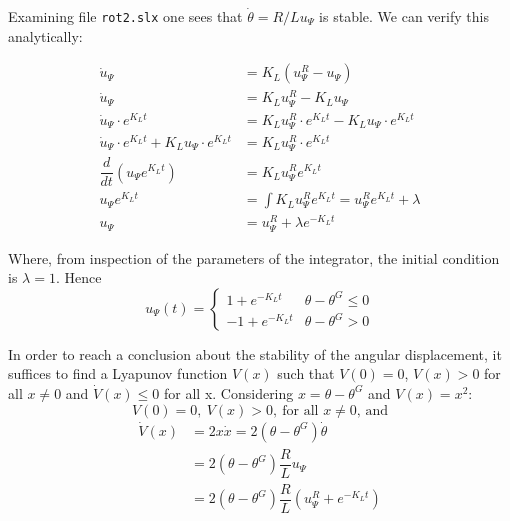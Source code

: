 Examining file \texttt{rot2.slx} one sees that $\dot{\theta} = R/L u_{\Psi}$ is
stable. We can verify this analytically:

\begin{align*}
  \dot{u}_{\Psi} &= K_L (u_{\Psi}^R - u_{\Psi})  \\
  \dot{u}_{\Psi} &= K_L u_{\Psi}^R - K_L u_{\Psi}  \\
  \dot{u}_{\Psi} \cdot e^{K_L t} &= K_L u_{\Psi}^R \cdot e^{K_L t} - K_L u_{\Psi} \cdot e^{K_L t}  \\
  \dot{u}_{\Psi} \cdot e^{K_L t} + K_L u_{\Psi} \cdot e^{K_L t} &= K_L u_{\Psi}^R \cdot e^{K_L t} \\
  \dfrac{d}{dt}(u_{\Psi} e^{K_L t}) &= K_L u_{\Psi}^R e^{K_L t} \\
  u_{\Psi} e^{K_L t} &= \int K_L u_{\Psi}^R e^{K_L t} = u_{\Psi}^R e^{K_L t} + \lambda \\
  u_{\Psi} &= u_{\Psi}^R + \lambda e^{-K_L t}
\end{align*}

Where, from inspection of the parameters of the integrator, the initial
condition is $\lambda = 1$. Hence
\begin{equation}
  u_{\Psi}(t) = \left\{
    \begin{matrix}
    1 + e^{-K_L t} & \theta - \theta^G \leq 0 \\
    -1 +e^{-K_L t} & \theta - \theta^G > 0
    \end{matrix}\right.
\end{equation}

In order to reach a conclusion about the stability of the angular displacement,
it suffices to find a Lyapunov function $V(x)$ such that $V(0) = 0$, $V(x) > 0$
for all $x \neq 0$ and $\dot{V}(x) \leq 0$ for all x. Considering
$x = \theta - \theta^G$ and $V(x) = x^2$:
$$V(0) = 0,\ V(x) > 0,\ \text{for all } x \neq 0\text{, and}$$
\begin{align*}
  \dot{V}(x) &= 2 x \dot{x} = 2 (\theta - \theta^G) \dot{\theta}  \\
             &= 2 (\theta - \theta^G) \dfrac{R}{L} u_{\Psi} \\
             &= 2 (\theta - \theta^G) \dfrac{R}{L} (u_{\Psi}^R + e^{-K_L t})
\end{align*}

